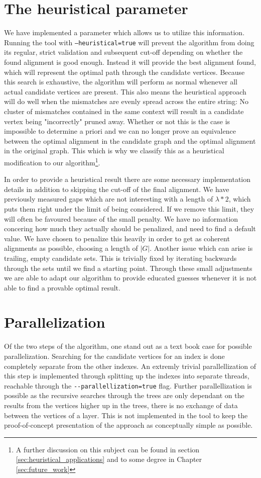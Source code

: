 \documentclass[thesis.tex]{subfiles}
\begin{document}
\section{The heuristical parameter}
\label{sec:implementation_heuristic}
We have implemented a parameter which allows us to utilize this information. Running the tool with \texttt{--heuristical=true} will prevent the algorithm from doing its regular, strict validation and subsequent cut-off depending on whether the found alignment is good enough. Instead it will provide the best alignment found, which will represent the optimal path through the candidate vertices. Because this search is exhaustive, the algorithm will perform as normal whenever all actual candidate vertices are present. This also means the heuristical approach will do well when the mismatches are evenly spread across the entire string: No cluster of mismatches contained in the same context will result in a candidate vertex being "incorrectly" pruned away. Whether or not this is the case is impossible to determine a priori and we can no longer prove an equivalence between the optimal alignment in the candidate graph and the optimal alignment in the original graph. This which is why we classify this as a heuristical modification to our algorithm\footnote{A further discussion on this subject can be found in section \ref{sec:heuristical_applications} and to some degree in Chapter \ref{sec:future_work}}.\\
\par\noindent
In order to provide a heuristical result there are some necessary implementation details in addition to skipping the cut-off of the final alignment. We have previously measured gaps which are not interesting with a length of $\lambda*2$, which puts them right under the limit of being considered. If we remove this limit, they will often be favoured because of the small penalty. We have no information concering how much they actually should be penalized, and need to find a default value. We have chosen to penalize this heavily in order to get as coherent alignments as possible, choosing a length of $|G|$. Another issue which can arise is trailing, empty candidate sets. This is trivially fixed by iterating backwards through the sets until we find a starting point. Through these small adjustments we are able to adapt our algorithm to provide educated guesses whenever it is not able to find a provable optimal result.
\section{Parallelization}
Of the two steps of the algorithm, one stand out as a text book case for possible parallelization. Searching for the candidate vertices for an index is done completely separate from the other indexes. An extremly trivial parallellization of this step is implemented through splitting up the indexes into separate threads, reachable through the \texttt{-{}-parallellization=true} flag. Further parallellization is possible as the recursive searches through the trees are only dependant on the results from the vertices higher up in the trees, there is no exchange of data between the vertices of a layer. This is not implemented in the tool to keep the proof-of-concept presentation of the approach as conceptually simple as possible.
\clearpage
\end{document}
